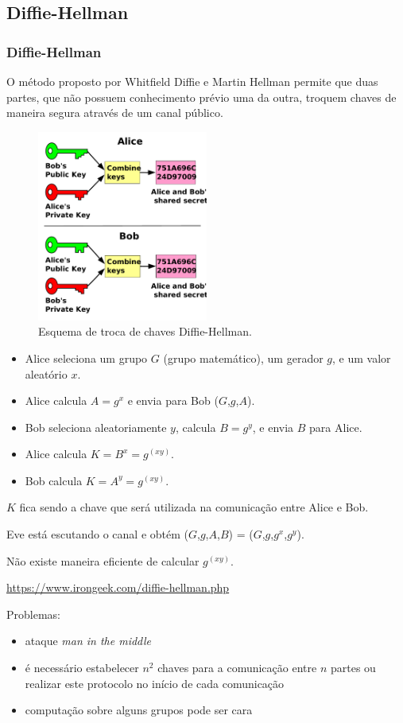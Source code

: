 \subsection{Diffie-Hellman}
\begin{frame}[allowframebreaks]
\frametitle{Diffie-Hellman}
O método proposto por Whitfield Diffie e Martin Hellman permite que duas partes,
que não possuem conhecimento prévio uma da outra, troquem chaves de maneira segura através de um canal público.

\begin{figure}[h]
\centering
\includegraphics[width=0.5\textwidth,height=0.5\textheight,keepaspectratio]{figures/public_key_shared_secret.pdf}
\caption{Esquema de troca de chaves Diffie-Hellman.}
\label{fig-diffiehellman}
\end{figure}

\framebreak
\begin{itemize}
\item Alice seleciona um grupo $G$ (grupo matemático), um gerador $g$, e um valor aleatório $x$.
\item Alice calcula $A = g^x$ e envia para Bob ($G$,$g$,$A$).
\item Bob seleciona aleatoriamente $y$, calcula $B = g^y$, e envia $B$ para Alice.
\item Alice calcula $K = B^x= g^{(xy)}$.
\item Bob calcula $K = A^y= g^{(xy)}$.
\end{itemize}

$K$ fica sendo a chave que será utilizada na comunicação entre Alice e Bob.

Eve está escutando o canal e obtém ($G$,$g$,$A$,$B$) = ($G$,$g$,$g^x$,$g^y$).

Não existe maneira eficiente de calcular $g^{(xy)}$.

\vspace{3ex}
\url{https://www.irongeek.com/diffie-hellman.php}


\framebreak
Problemas:
\begin{itemize}
\item ataque \emph{man in the middle}
\item é necessário estabelecer $n^2$ chaves para a comunicação entre $n$ partes ou realizar este protocolo no início de cada comunicação
\item computação sobre alguns grupos pode ser cara
\end{itemize}

\end{frame}


